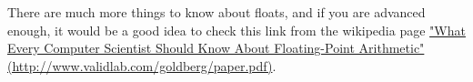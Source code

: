 \documentclass[a4paper,10pt,twoside]{book}
\begin{document}
%
%
%
%
%
%


There are much more things to know about floats, and if you are advanced enough, it would be a good idea to check this link from the wikipedia page \href{http://www.validlab.com/goldberg/paper.pdf}{"What Every Computer Scientist Should Know About Floating-Point Arithmetic" (http://www.validlab.com/goldberg/paper.pdf)}.


\ifx\wholebook\relax\else
   
   
\end{document}
